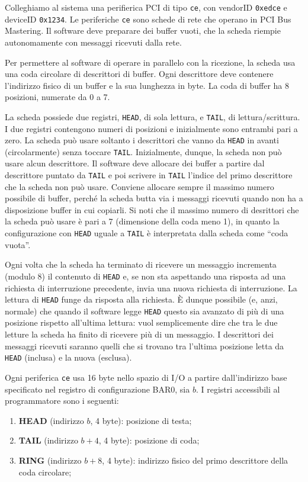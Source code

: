 Colleghiamo al sistema una perifierica PCI di tipo \verb|ce|, con vendorID \verb|0xedce| e deviceID \verb|0x1234|.
Le periferiche \verb|ce| sono schede di rete che operano in PCI Bus Mastering. 
Il software deve preparare dei buffer vuoti, che la scheda riempie autonomamente con messaggi
ricevuti dalla rete.

Per permettere al software di operare in parallelo con la ricezione, la scheda usa una coda circolare
di descrittori di buffer.
Ogni descrittore deve contenere l'indirizzo fisico di un buffer e la
sua lunghezza in byte. La coda di buffer ha 8 posizioni, numerate da 0 a 7.

La scheda possiede due registri, \verb|HEAD|, di sola lettura, e \verb|TAIL|,
di lettura/scrittura.
I due registri contengono numeri di posizioni e inizialmente sono
entrambi pari a zero. La scheda pu\`o usare soltanto i descrittori che vanno da \verb|HEAD|
in avanti (circolarmente) senza toccare \verb|TAIL|\@. Inizialmente, dunque, la scheda non pu\`o
usare alcun descrittore. Il software deve allocare dei buffer a partire dal descrittore
puntato da \verb|TAIL| e poi scrivere in \verb|TAIL| l'indice del primo descrittore
che la scheda non pu\`o usare. Conviene allocare sempre il massimo numero possibile di buffer,
perch\'e la scheda butta via i messaggi ricevuti quando non ha a disposizione buffer in cui copiarli.
Si noti che il massimo numero di desrittori che la scheda pu\`o usare \`e pari a 7 (dimensione della
coda meno 1), in quanto la configurazione con \verb|HEAD| uguale a \verb|TAIL| \`e interpretata
dalla scheda come ``coda vuota''.

Ogni volta che la scheda ha terminato di ricevere un messaggio
incrementa (modulo 8) il contenuto di \verb|HEAD| e, se non sta aspettando una risposta ad una
richiesta di interruzione precedente, invia una nuova richiesta di interruzione.
La lettura di \verb|HEAD| funge da risposta alla richiesta. 
\`E dunque possibile (e, anzi, normale) che quando il software legge \verb|HEAD|
questo sia avanzato di pi\`u di una posizione rispetto all'ultima lettura:
vuol semplicemente dire che tra le due letture la scheda ha finito di ricevere pi\`u di un messaggio.
I descrittori dei messaggi ricevuti saranno quelli che si trovano tra l'ultima posizione
letta da \verb|HEAD| (inclusa) e la nuova (esclusa).

Ogni  periferica \verb|ce| usa 16 byte nello spazio di I/O a partire dall'indirizzo base specificato nel
registro di configurazione BAR0, sia $b$.
I registri accessibili al programmatore sono i seguenti:
\begin{enumerate}
  \item {\bf HEAD} (indirizzo $b$, 4 byte): posizione di testa;
  \item {\bf TAIL} (indirizzo $b+4$, 4 byte): posizione di coda;
  \item {\bf RING} (indirizzo $b+8$, 4 byte): indirizzo fisico del primo descrittore della coda circolare;
\end{enumerate}

